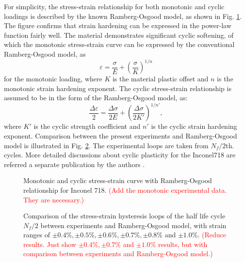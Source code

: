 \documentclass[preprint,5p,twocolumn,11pt,sort&compress]{elsarticle}
\newcommand{\marked}[1]{\textcolor{red}{#1}}
\begin{document}
For simplicity, the stress-strain relationship for both monotonic and cyclic loadings is described by the known Ramberg-Osgood model, as shown in Fig. \ref{Fig:plot_monotonic_cyclic_osgood}. The figure confirms that strain hardening can be expressed in the power-law function fairly well. The material demonstrates significant cyclic softening, of which the monotonic stress-strain curve can be expressed by the conventional Ramberg-Osgood model, as
\begin{equation}
{\varepsilon } = \frac{{\sigma }}{{E}} + {\left( {\frac{{\sigma }}{{K}}} \right)^{1/n}}
\end{equation}
for the monotonic loading, where $K$ is the material plastic offset and $n$ is the monotonic strain hardening exponent.
The cyclic stress-strain relationship is assumed to be in the form of the Ramberg-Osgood model, as:
\begin{equation}
\frac{{\Delta \varepsilon }}{2} = \frac{{\Delta \sigma }}{{2E}} + {\left( {\frac{{\Delta \sigma }}{{2K'}}} \right)^{1/n'}},
\end{equation}
where $K'$ is the cyclic strength coefficient and $n'$ is the cyclic strain hardening exponent.
Comparison between the present experiments and Ramberg-Osgood model is illustrated in Fig. \ref{Fig:plot_exp_half_life_cycle}. The experimental loops are taken from $N_f/2$th. cycles.
More detailed discussions about cyclic plasticity for the Inconel718 are referred a separate publication by the authors \cite{Sun2017}.

\begin{figure}[!htp]
\caption{Monotonic and cyclic stress-strain curve with Ramberg-Osgood relationship for Inconel 718. \marked{(Add the monotonic experimental data. They are necessary.)}}
\label{Fig:plot_monotonic_cyclic_osgood}
\end{figure}


\begin{figure}[!htp]
\caption{Comparison of the stress-strain hysteresis loops of the half life cycle $N_f/2$ between experiments and Ramberg-Osgood model, with strain ranges of $\pm0.4\%, \pm0.5\%, \pm0.6\%, \pm0.7\%, \pm0.8\%$ and $\pm1.0\%$. \marked{(Reduce results. Just show  $\pm0.4\%,  \pm0.7\%$ and $\pm1.0\%$ results, but with comparison between experiments and Ramberg-Osgood model.)}}
\label{Fig:plot_exp_half_life_cycle}
\end{figure}
\end{document}
